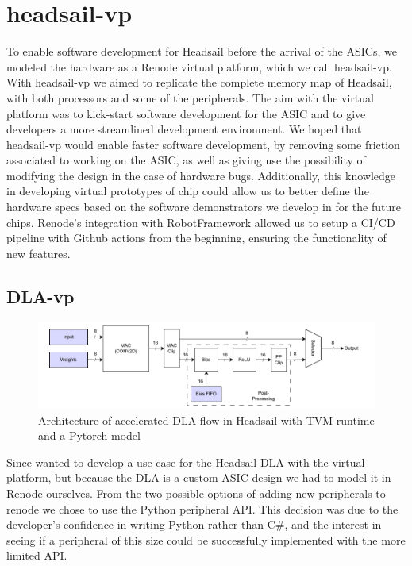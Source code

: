 \documentclass[12pt,a4paper,english
]{tunithesis}
\begin{document}
\section{headsail-vp}
To enable software development for Headsail before the arrival of the ASICs, we modeled the hardware as a Renode virtual platform, which we call headsail-vp. With headsail-vp we aimed to replicate the complete memory map of Headsail, with both processors and some of the peripherals.
The aim with the virtual platform was to kick-start software development for the ASIC and to give developers a more streamlined development environment.
We hoped that headsail-vp would enable faster software development, by removing some friction associated to working on the ASIC, as well as giving use the possibility of modifying the design in the case of hardware bugs.
Additionally, this knowledge in developing virtual prototypes of chip could allow us to better define the hardware specs based on the software demonstrators we develop in for the future chips.
Renode's integration with RobotFramework allowed us to setup a CI/CD pipeline with Github actions from the beginning, ensuring the functionality of new features.

\subsection{DLA-vp}

\begin{figure}
\centering
\includegraphics[width=\linewidth]{img/dla-internal.pdf}
\caption{Architecture of accelerated DLA flow in Headsail with TVM runtime and a Pytorch model}
\label{fig:dla_internal}
\end{figure}

Since wanted to develop a use-case for the Headsail DLA with the virtual platform, but because the DLA is a custom ASIC design we had to model it in Renode ourselves. From the two possible options of adding new peripherals to renode we chose to use the Python peripheral API. This decision was due to the developer's confidence in writing Python rather than C\#, and the interest in seeing if a peripheral of this size could be successfully implemented with the more limited API.
\end{document}
